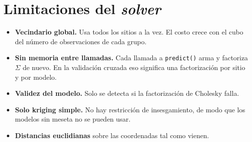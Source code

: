 \documentclass[11pt,a4paper]{article}
\newcommand{\code}[1]{\texttt{#1}}
\begin{document}
\section{Limitaciones del \emph{solver}}

\begin{itemize}
  \item \textbf{Vecindario global.} Usa todos los sitios a la vez. El costo
        crece con el cubo del número de observaciones de cada grupo.
  \item \textbf{Sin memoria entre llamadas.} Cada llamada a \code{predict()}
        arma y factoriza $\Sigma$ de nuevo. En la validación cruzada eso
        significa una factorización por sitio y por modelo.
  \item \textbf{Validez del modelo.} Solo se detecta si la factorización de
        Cholesky falla.
  \item \textbf{Solo kriging simple.} No hay restricción de insesgamiento, de
        modo que los modelos sin meseta no se pueden usar.
  \item \textbf{Distancias euclidianas} sobre las coordenadas tal como vienen.
\end{itemize}
\end{document}
